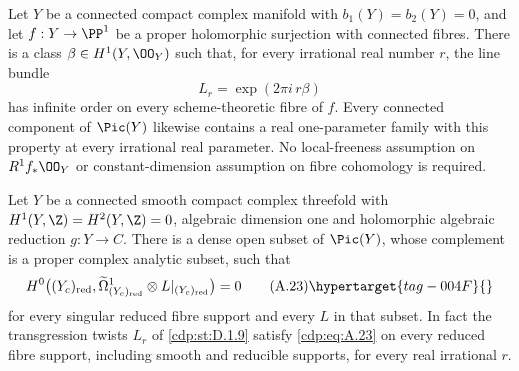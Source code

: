 \begin{proposition}\hypertarget{tag-01G7}{}\label{cdp:st:D.1.9}


Let $Y$ be a connected compact complex manifold with
$b_1(Y)=b_2(Y)=0$, and let $f:Y\to\PP^1$ be a proper
holomorphic surjection with connected fibres. There is a class
$\beta\in H^1(Y,\OO_Y)$ such that, for every irrational real number
$r$, the line bundle
\[
L_r=\exp(2\pi i\,r\beta)
\]
has infinite order on every scheme-theoretic fibre of $f$.
Every connected component of $\Pic(Y)$ likewise contains a real
one-parameter family with this property at every irrational real
parameter.
No local-freeness assumption on $R^1f_*\OO_Y$ or constant-dimension
assumption on fibre cohomology is required.
\end{proposition}

\begin{proposition}\hypertarget{tag-01AY}{}\label{cdp:st:A.4.9}


Let $Y$ be a connected smooth compact complex threefold with $H^1(Y,\Z)=H^2(Y,\Z)=0$, algebraic dimension one and holomorphic algebraic reduction $g:Y\to C$. There is a dense open subset of $\Pic(Y)$, whose complement is a proper complex analytic subset, such that
\[
 H^0\bigl((Y_c)_{\rm red},
       \widetilde\Omega^1_{(Y_c)_{\rm red}}\otimes L|_{(Y_c)_{\rm red}}\bigr)=0
 \tag{A.23}\hypertarget{tag-004F}{}\label{cdp:eq:A.23}
\]
for every singular reduced fibre support and every $L$ in that subset. In fact the transgression twists $L_r$ of \ref{cdp:st:D.1.9} satisfy \eqref{cdp:eq:A.23} on every reduced fibre support, including smooth and reducible supports, for every real irrational $r$.
\end{proposition}

